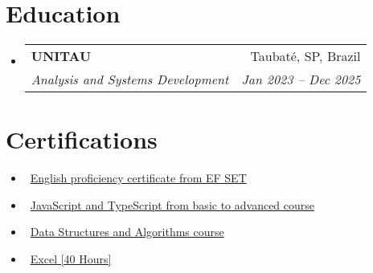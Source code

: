 \documentclass[letterpaper,10pt]{article}
\makeatletter
\newcommand{\resumeItem}[1]{\item\small{#1}}
\newcommand{\resumeSubheading}[4]{
\vspace{-1pt}\item
  \begin{tabular*}{0.97\textwidth}[t]{l@{\extracolsep{\fill}}r}
    \textbf{#1} & #2 \\
    \textit{#3} & \textit{#4} \\
  \end{tabular*}\vspace{-7pt}
}
\newcommand{\resumeSubHeadingList}{\begin{itemize}[leftmargin=0.15in, label={}]}
\newcommand{\resumeSubHeadingListEnd}{\end{itemize}}
\makeatother
\begin{document}
\section{Education}
\resumeSubHeadingList
  \resumeSubheading
      {UNITAU}{Taubaté, SP, Brazil}
      {Analysis and Systems Development} {Jan 2023 -- Dec 2025}
\resumeSubHeadingListEnd

\section{Certifications}
\resumeSubHeadingList
    \resumeItem{\textbullet\ \normalsize{\href{https://cert.efset.org/KdGLiQ}{English proficiency certificate from EF SET}}}
    \resumeItem{\textbullet\ \normalsize{\href{https://udemy-certificate.s3.amazonaws.com/image/UC-6fc7d4af-701d-446a-b69b-8e167018a749.jpg?v=1706800581000}{JavaScript and TypeScript from basic to advanced course}}}
    \resumeItem{\textbullet\ \normalsize{\href{https://udemy-certificate.s3.amazonaws.com/image/UC-7074fe91-0541-4bfd-bc58-af41912a6361.jpg?v=1703254492000}{Data Structures and Algorithms course}}}
    \resumeItem{\textbullet\ \normalsize{\href{https://www.cursoemvideo.com/validacao-de-certificado/?codigo=798CE-654D-9}{Excel [40 Hours]}}}
\resumeSubHeadingListEnd
\end{document}
